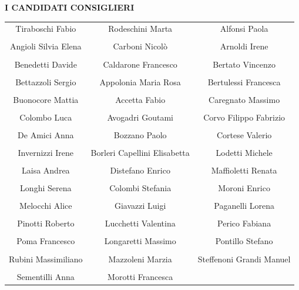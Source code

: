 \onecolumn
\thispagestyle{empty}
\begin{center}\chaptithuge\bfseries
  I CANDIDATI CONSIGLIERI
\end{center}
{}
\newlength\constabsep
\setlength\constabsep{18pt}
\vfill{}
\begin{center}
  \begin{tabular}{ccc}
    Tiraboschi Fabio
    &
    Rodeschini Marta
    &
    Alfonsi Paola
    \\\\
    Angioli Silvia Elena
    &
    Carboni Nicolò
    &
    Arnoldi Irene
    \\\\
    Benedetti Davide
    &
    Caldarone Francesco
    &
    Bertato Vincenzo
    \\\\
    Bettazzoli Sergio
    &
    Appolonia Maria Rosa
    &
    Bertulessi Francesca
    \\\\
    Buonocore Mattia
    &
    Accetta Fabio
    &
    Caregnato Massimo
    \\\\
    Colombo Luca
    &
    Avogadri Goutami
    &
    Corvo Filippo Fabrizio
    \\\\
    De Amici Anna
    &
    Bozzano Paolo
    &
    Cortese Valerio
    \\\\
    Invernizzi Irene
    &
    Borleri Capellini Elisabetta
    &
    Lodetti Michele
    \\\\
    Laisa Andrea
    &
    Distefano Enrico
    &
    Maffioletti Renata
    \\\\
    Longhi Serena
    &
    Colombi Stefania
    &
    Moroni Enrico
    \\\\
    Melocchi Alice
    &
    Giavazzi Luigi
    &
    Paganelli Lorena
    \\\\
    Pinotti Roberto
    &
    Lucchetti Valentina
    &
    Perico Fabiana
    \\\\
    Poma Francesco
    &
    Longaretti Massimo
    &
    Pontillo Stefano
    \\\\
    Rubini Massimiliano
    &
    Mazzoleni Marzia
    &
    Steffenoni Grandi Manuel
    \\\\
    Sementilli Anna
    &
    Morotti Francesca
    &
    

\end{tabular}
\end{center}
